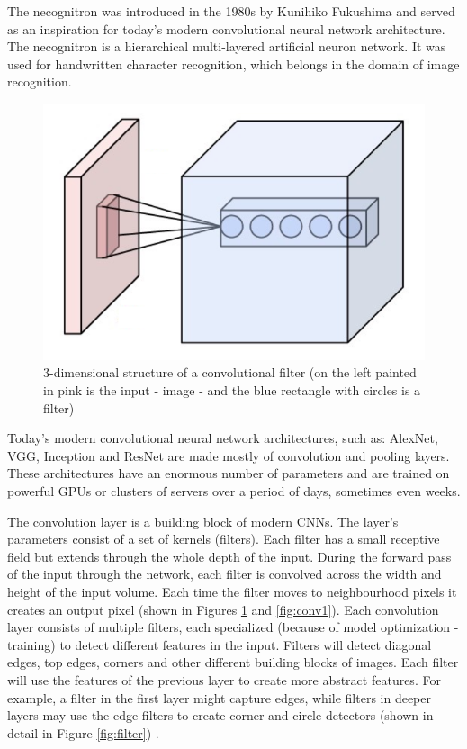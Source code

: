 \documentclass[times, utf8, diplomski]{fer}
\begin{document}
The necognitron was introduced in the 1980s by Kunihiko Fukushima \citep{fukushima_neocognitron:_1982, eckmiller_hierarchical_1989} and served as an inspiration for today's modern convolutional neural network architecture. The necognitron is a hierarchical multi-layered artificial neuron network. It was used for handwritten character recognition, which belongs in the domain of image recognition.

\begin{figure}
  \includegraphics[scale=0.5]{figures/conv.png}
  \centering
  \caption{3-dimensional structure of a convolutional filter (on the left painted in pink is the input - image - and the blue rectangle with circles is a filter)}
  \label{fig:conv}
\end{figure}

Today's modern convolutional neural network architectures, such as: AlexNet, VGG, Inception and ResNet \citep{krizhevsky_imagenet_2012, simonyan_very_2014, szegedy_going_2015, he_deep_2016} are made mostly of convolution and pooling layers. These architectures have an enormous number of parameters and are trained on powerful GPUs or clusters of servers over a period of days, sometimes even weeks.

The convolution layer is a building block of modern CNNs. The layer's parameters consist of a set of kernels (filters). Each filter has a small receptive field but extends through the whole depth of the input. During the forward pass of the input through the network, each filter is convolved across the width and height of the input volume. Each time the filter moves to neighbourhood pixels it creates an output pixel (shown in Figures \ref{fig:conv} and \ref{fig:conv1}). Each convolution layer consists of multiple filters, each specialized (because of model optimization - training) to detect different features in the input. Filters will detect diagonal edges, top edges, corners and other different building blocks of images. Each filter will use the features of the previous layer to create more abstract features. For example, a filter in the first layer might capture edges, while filters in deeper layers may use the edge filters to create corner and circle detectors (shown in detail in Figure \ref{fig:filter}) \citep{simonyan_very_2014}.
\end{document}
